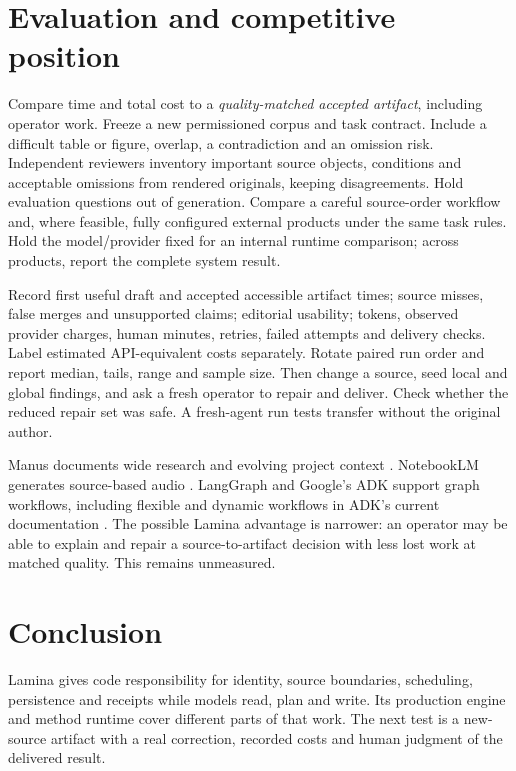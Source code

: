 \documentclass[11pt,letterpaper]{article}
\begin{document}
\section{Evaluation and competitive position}
Compare time and total cost to a \emph{quality-matched accepted artifact}, including operator work. Freeze a new permissioned corpus and task contract. Include a difficult table or figure, overlap, a contradiction and an omission risk. Independent reviewers inventory important source objects, conditions and acceptable omissions from rendered originals, keeping disagreements. Hold evaluation questions out of generation. Compare a careful source-order workflow and, where feasible, fully configured external products under the same task rules. Hold the model/provider fixed for an internal runtime comparison; across products, report the complete system result.

Record first useful draft and accepted accessible artifact times; source misses, false merges and unsupported claims; editorial usability; tokens, observed provider charges, human minutes, retries, failed attempts and delivery checks. Label estimated API-equivalent costs separately. Rotate paired run order and report median, tails, range and sample size. Then change a source, seed local and global findings, and ask a fresh operator to repair and deliver. Check whether the reduced repair set was safe. A fresh-agent run tests transfer without the original author.

Manus documents wide research and evolving project context \cite{manus2026,manusprojects2026}. NotebookLM generates source-based audio \cite{notebooklm2026}. LangGraph and Google's ADK support graph workflows, including flexible and dynamic workflows in ADK's current documentation \cite{langgraph2026,googleadk2026}. The possible Lamina advantage is narrower: an operator may be able to explain and repair a source-to-artifact decision with less lost work at matched quality. This remains unmeasured.

\section{Conclusion}
Lamina gives code responsibility for identity, source boundaries, scheduling, persistence and receipts while models read, plan and write. Its production engine and method runtime cover different parts of that work. The next test is a new-source artifact with a real correction, recorded costs and human judgment of the delivered result.


\begingroup
\small
\setlength{\bibsep}{0.12em}

\endgroup
\end{document}
